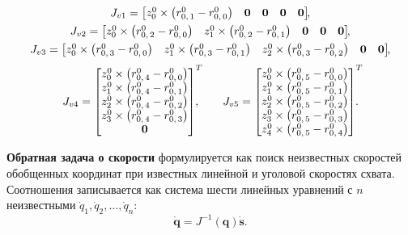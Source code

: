 \begin{gather*}
J_{v1} =
\begin{bmatrix}
z^0_0 \times \left( r^0_{0,\,1} - r^0_{0,\,0}\right) & \mathbf0 & \mathbf0 & \mathbf0 & \mathbf0
\end{bmatrix}\!\!,
\\
J_{v2} =
\begin{bmatrix}
z^0_0 \times \left( r^0_{0,\,2} - r^0_{0,\,0}\right) & z^0_1 \times \left( r^0_{0,\,2} - r^0_{0,\,1}\right) & \mathbf0 & \mathbf0 & \mathbf0
\end{bmatrix}\!\!,
\\
J_{v3} =
\begin{bmatrix}
z^0_0 \times \left( r^0_{0,\,3} - r^0_{0,\,0}\right) & z^0_1 \times \left( r^0_{0,\,3} - r^0_{0,\,1}\right) &
z^0_2 \times \left( r^0_{0,\,3} - r^0_{0,\,2}\right) & \mathbf0 & \mathbf0
\end{bmatrix}\!\!,
\end{gather*}
\begin{gather*}
J_{v4} =
\begin{bmatrix}
z^0_0 \times \left( r^0_{0,\,4} - r^0_{0,\,0}\right) \\
z^0_1 \times \left( r^0_{0,\,4} - r^0_{0,\,1}\right) \\
z^0_2 \times \left( r^0_{0,\,4} - r^0_{0,\,2}\right) \\
z^0_3 \times \left( r^0_{0,\,4} - r^0_{0,\,3}\right) \\
\nv
\end{bmatrix}^T\!\!\!\!\!,
\qquad
J_{v5} =
\begin{bmatrix}
z^0_0 \times \left( r^0_{0,\,5} - r^0_{0,\,0}\right) \\
z^0_1 \times \left( r^0_{0,\,5} - r^0_{0,\,1}\right) \\
z^0_2 \times \left( r^0_{0,\,5} - r^0_{0,\,2}\right) \\
z^0_3 \times \left( r^0_{0,\,5} - r^0_{0,\,3}\right) \\
z^0_4 \times \left( r^0_{0,\,5} - r^0_{0,\,4}\right)
\end{bmatrix}^T\!\!\!\!\!.
\end{gather*}


\textbf{Обратная задача о скорости} формулируется как поиск неизвестных скоростей обобщенных координат при известных линейной и уголовой скоростях схвата. Соотношения записывается как система шести линейных уравнений с $ n $ неизвестными $ \dot{q}_1, \dot{q}_2, \dots, \dot{q}_n $:
\begin{equation}\label{ivp}
	\dot{\mathbf{q}} =  J^{-1}(\mathbf{q})\dot{\mathbf{s}}.
\end{equation}


